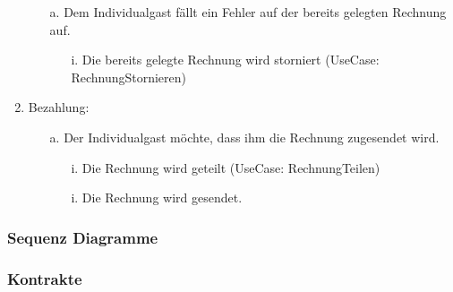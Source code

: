 \documentclass[./detailed_overview_usecases.tex]{subfiles}
\begin{document}
\begin{enumerate}
        \begin{itemize}
            \item[a.] Dem Individualgast fällt ein Fehler auf der bereits gelegten Rechnung auf.
            \begin{itemize}
                \item[i.] Die bereits gelegte Rechnung wird storniert (UseCase: RechnungStornieren)
            \end{itemize}
        \end{itemize}
        \setcounter{enumi}{5}
        \item Bezahlung: \begin{itemize}
                             \item[a.] Der Individualgast möchte, dass ihm die Rechnung zugesendet wird.
                             \begin{itemize}
                                 \item[i.] Die Rechnung wird geteilt (UseCase: RechnungTeilen)
                                 \item[i.] Die Rechnung wird gesendet.
                             \end{itemize}
        \end{itemize}
    \end{enumerate}

    \subsubsection{Sequenz Diagramme}
    \subsubsection{Kontrakte}
\end{document}
